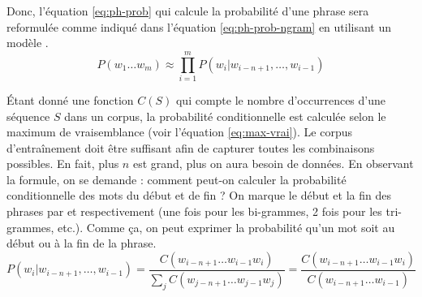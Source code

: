 \documentclass{KodeBook}
\begin{document}
Donc, l'équation \ref{eq:ph-prob} qui calcule la probabilité d'une phrase sera reformulée comme indiqué dans l'équation \ref{eq:ph-prob-ngram} en utilisant un modèle .
\begin{equation}\label{eq:ph-prob-ngram}
	P(w_1 \ldots w_m) \approx \prod_{i=1}^{m} P(w_i | w_{i-n+1}, \ldots, w_{i-1})
\end{equation}

Étant donné une fonction $C(S)$ qui compte le nombre d'occurrences d'une séquence $S$ dans un corpus, la probabilité conditionnelle est calculée selon le maximum de vraisemblance (voir l'équation \ref{eq:max-vrai}).
Le corpus d'entraînement doit être suffisant afin de capturer toutes les combinaisons possibles. 
En fait, plus $n$ est grand, plus on aura besoin de données.
En observant la formule, on se demande : comment peut-on calculer la probabilité conditionnelle des mots du début et de fin ?
On marque le début et la fin des phrases par  et  respectivement (une fois pour les bi-grammes, 2 fois pour les tri-grammes, etc.). 
Comme ça, on peut exprimer la probabilité qu'un mot soit au début ou à la fin de la phrase.
\begin{equation}
	P(w_i | w_{i-n+1},\ldots, w_{i-1}) 
	= \frac{C(w_{i-n+1} \ldots w_{i-1} w_i)}{\sum_j C(w_{j-n+1} \ldots w_{j-1} w_j)}
	= \frac{C(w_{i-n+1} \ldots w_{i-1} w_i)}{C(w_{i-n+1} \ldots w_{i-1})}
	\label{eq:max-vrai}
\end{equation}
\end{document}
